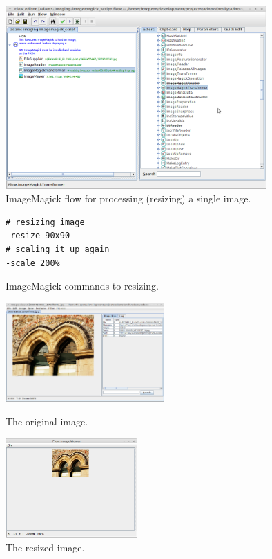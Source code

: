 \documentclass[a4paper]{book}
\begin{document}
\begin{figure}[htb]
  \centering
  \includegraphics[width=10.0cm]{images/imagemagick-resize-flow.png}
  \caption{ImageMagick flow for processing (resizing) a single image.}
  \label{imagemagick-resize-flow}
\end{figure}

\begin{figure}[htb]
  \begin{center}
  \begin{varwidth}{\textwidth}
\begin{verbatim}
# resizing image
-resize 90x90
# scaling it up again
-scale 200%
\end{verbatim}
  \end{varwidth}
  \end{center}
  \caption{ImageMagick commands to resizing.}
  \label{imagemagick-resize-script}
\end{figure}

\begin{figure}[htb]
  \begin{minipage}[b]{0.48\linewidth}
  \centering
  \includegraphics[height=3.8cm]{images/imagemagick-resize-original.png}
  \caption{The original image.}
  \label{imagemagick-resize-original}
  \end{minipage}%
  \begin{minipage}[b]{0.48\linewidth}
  \centering
  \includegraphics[height=3.8cm]{images/imagemagick-resize-output.png}
  \caption{The resized image.}
  \label{imagemagick-resize-output}
  \end{minipage}
\end{figure}
\end{document}
